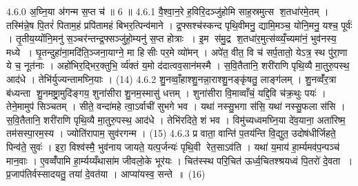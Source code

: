 4.6.0
अ॒घ्नि॒या अ॑गन्म स॒प्त च॑ ॥ 6 ॥
4.6.1
वै॒श्वा॒न॒रे ह॒विरि॒दञ्जु॑होमि साह॒स्रमुत्स श॒तधा॑रमे॒तम् । तस्मि॑न्ने॒ष पि॒तरं॑ पिताम॒हं प्रपि॑तामहं बिभर॒त्पिन्व॑माने । द्र॒फ्सश्च॑स्कन्द पृथि॒वीमनु॒ द्यामि॒मञ्च॒ योनि॒मनु॒ यश्च॒ पूर्वः॑ । तृ॒तीय॒य्योंनि॒मनु॑ स॒ञ्चर॑न्तन्द्र॒फ्सञ्जु॑हो॒म्यनु॑ स॒प्त होत्राः । इ॒म स॑मु॒द्र श॒तधा॑र॒मुत्स॑व्व्यँ॒च्यमा॑नं॒ भुव॑नस्य॒ मध्ये । घृ॒तन्दुहा॑ना॒मदि॑ति॒ञ्जना॒याग्ने॒ मा हिसीः पर॒मे व्यो॑मन् । अपे॑त॒ वीत॒ वि च॑ सर्प॒तातो॒ येऽत्र॒ स्थ पु॑रा॒णा ये च॒ नूत॑नाः । अहो॑भिर॒द्भिर॒क्तुभि॒ र्व्य॑क्तं य॒मो द॑दात्वव॒सान॑मस्मै । स॒वि॒तैतानि॒ शरी॑राणि पृथि॒व्यै मा॒तुरु॒पस्थ॒ आद॑धे । तेभि॑र्युज्यन्तामघ्नि॒याः । (14)
4.6.2
शु॒नव्वाँ॒हाश्शु॒नन्ना॒राश्शु॒नङ्कृ॑षतु॒ लाङ्ग॑लम् । शु॒नव्वँ॑र॒त्रा ब॑ध्यन्ता शु॒नमष्ट्रा॒मुदि॑ङ्गय॒ शुना॑सीरा शु॒नम॒स्मासु॑ धत्तम् । शुना॑सीरा वि॒माव्वाँचं॒ यद्दि॒वि च॑क्र॒थुः पयः॑ । तेने॒मामुप॑ सिञ्चतम् । सीते॒ वन्दा॑महे त्वा॒ऽर्वाची॑ सुभगे भव । यथा॑ नस्सु॒भगा स॑सि॒ यथा॑ नस्सु॒फला स॑सि । स॒वि॒तैतानि॒ शरी॑राणि पृथि॒व्यै मा॒तुरु॒पस्थ॒ आद॑धे । तेभि॑रदिते॒ शं भव । विमु॑च्यध्वमघ्नि॒या दे॑व॒याना॒ अता॑रिष्म॒ तम॑सस्पा॒रम॒स्य । ज्योति॑रापाम॒ सुव॑रगन्म । (15)
4.6.3
प्र वाता॒ वान्ति॑ प॒तय॑न्ति वि॒द्युत॒ उदोष॑धीर्जिहते॒ पिन्व॑ते॒ सुवः॑ । इरा॒ विश्व॑स्मै॒ भुव॑नाय जायते॒ यत्प॒र्जन्यः॑ पृथि॒वी रेत॒साऽव॑ति । यथा॑ य॒माय॑ हा॒र्म्यमव॑प॒न्पञ्च॑ मान॒वाः । ए॒वव्वँ॑पामि हा॒र्म्यय्यँथासा॑म जीवलो॒के भूर॑यः । चित॑स्स्थ परि॒चित॑ ऊर्ध्व॒चितश्श्रयध्वं पि॒तरो॑ दे॒वता । प्र॒जाप॑तिर्वस्सादयतु॒ तया॑ दे॒वत॑या । आप्या॑यस्व॒ सन्ते ॥ (16)
\anuvakamend

